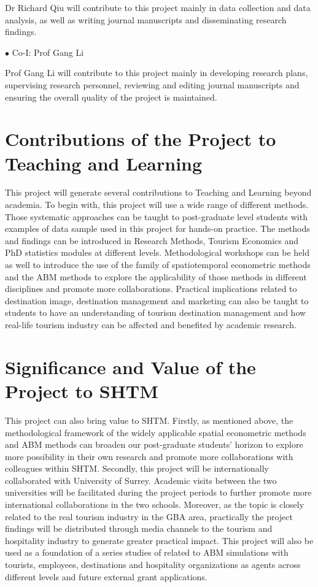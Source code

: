\documentclass[11pt,a4paper]{amsart}
\theoremstyle{plain}
\theoremstyle{definition}
\begin{document}
\noindent Dr Richard Qiu will contribute to this project mainly in data collection and data analysis, as well as writing journal manuscripts and disseminating research findings.
\vspace{3pt}

$\bullet$ Co-I: Prof Gang Li

\noindent Prof Gang Li will contribute to this project mainly in developing research plans, supervising research personnel, reviewing and editing journal manuscripts and ensuring the overall quality of the project is maintained. 

\section{Contributions of the Project to Teaching and Learning}
\noindent This project will generate several contributions to Teaching and Learning beyond academia. To begin with, this project will use a wide range of different methods. Those systematic approaches can be taught to post-graduate level students with examples of data sample used in this project for hands-on practice. The methods and findings can be introduced in Research Methods, Tourism Economics and PhD statistics modules at different levels. Methodological workshops can be held as well to introduce the use of the family of spatiotemporal econometric methods and the ABM methods to explore the applicability of those methods in different disciplines and promote more collaborations. Practical implications related to destination image, destination management and marketing can also be taught to students to have an understanding of tourism destination management and how real-life tourism industry can be affected and benefited by academic research.

\section{Significance and Value of the Project to SHTM}
\noindent This project can also bring value to SHTM. Firstly, as mentioned above, the methodological framework of the widely applicable spatial econometric methods and ABM methods can broaden our post-graduate students’ horizon to explore more possibility in their own research and promote more collaborations with colleagues within SHTM. Secondly, this project will be internationally collaborated with University of Surrey. Academic visits between the two universities will be facilitated during the project periods to further promote more international collaborations in the two schools. Moreover, as the topic is closely related to the real tourism industry in the GBA area, practically the project findings will be distributed through media channels to the tourism and hospitality industry to generate greater practical impact. This project will also be used as a foundation of a series studies of related to ABM simulations with tourists, employees, destinations and hospitality organizations as agents across different levels and future external grant applications. 

\printbibliography %
		
\end{document}
